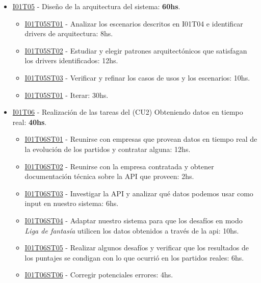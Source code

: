 \begin{itemize}
\item \underline{I01T05} - Diseño de la arquitectura del sistema: \textbf{60hs}.
  \begin{itemize}
    \item \underline{I01T05ST01} - Analizar los escenarios descritos en I01T04 e identificar drivers de arquitectura: 8hs. 
    \item \underline{I01T05ST02} - Estudiar y elegir patrones arquitectónicos que satisfagan los drivers identificados: 12hs.
    \item \underline{I01T05ST03} - Verificar y refinar los casos de usos y los escenarios: 10hs.
    \item \underline{I01T05ST01} - Iterar: 30hs.
   \end{itemize}
\hfill

\item \underline{I01T06} - Realización de las tareas del (CU2)  Obteniendo datos en tiempo real: \textbf{40hs}.
  \begin{itemize}
    \item \underline{I01T06ST01} - Reunirse con empresas que provean datos en tiempo real de la evolución de los partidos y contratar alguna: 12hs.
    \item \underline{I01T06ST02} - Reunirse con la empresa contratada y obtener documentación técnica sobre la API que proveen: 2hs.
    \item \underline{I01T06ST03} - Investigar la API y analizar qué datos podemos usar como input en nuestro sistema: 6hs.
    \item \underline{I01T06ST04} - Adaptar nuestro sistema para que los desafíos en modo \emph{Liga de fantasía} utilicen los datos obtenidos a través de la api: 10hs.
    \item \underline{I01T06ST05} - Realizar algunos desafíos y verificar que los resultados de los puntajes se condigan con lo que ocurrió en los partidos reales: 6hs.
    \item \underline{I01T06ST06} - Corregir potenciales errores: 4hs.
  \end{itemize}
\hfill


\end{itemize}
